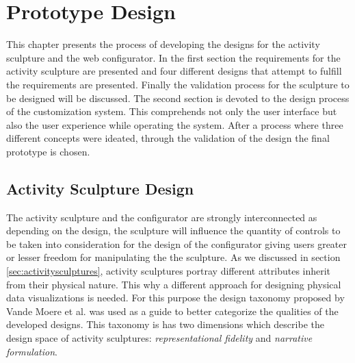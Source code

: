 \documentclass[../medieninformatik-arbeit.tex]{subfiles}
\begin{document}
\label{ch:proto}
\section{Prototype Design}
This chapter presents the process of developing the designs for the activity sculpture and the web configurator. In the first section the requirements for the activity sculpture are presented and four different designs that attempt to fulfill the requirements are presented. Finally the validation process for the sculpture to be designed will be discussed. The second section is devoted to the design process of the customization system. This comprehends not only the user interface but also the user experience while operating the system. After a process where three different concepts were ideated, through the validation of the design the final prototype is chosen. 

\subsection{Activity Sculpture Design}
The activity sculpture and the configurator are strongly interconnected as depending on the design, the sculpture will influence the quantity of controls to be taken into consideration for the design of the configurator giving users greater or lesser freedom for manipulating the the sculpture. As we discussed in section \ref{sec:activitysculptures}, activity sculptures portray different attributes inherit from their physical nature. This why a different approach for designing physical data visualizations is needed. For this purpose the design taxonomy proposed by Vande Moere et al.\cite{vande2009analyzing} was used as a guide to better categorize the qualities of the developed designs. This taxonomy is has two dimensions which describe the design space of activity sculptures: \textit{representational fidelity} and \textit{narrative formulation}. 
\end{document}
